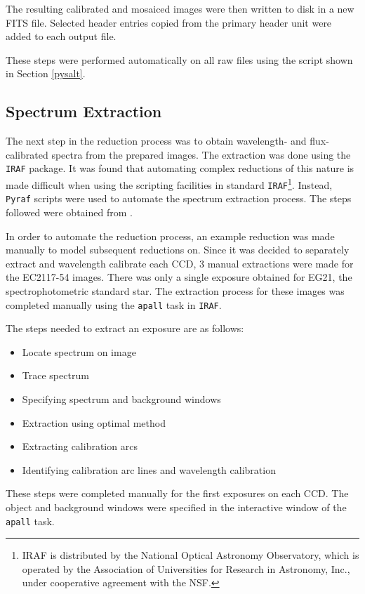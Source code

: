 The resulting calibrated and mosaiced images were then written to disk in a new FITS file. Selected header entries copied from the primary header unit were added to each output file.

These steps were performed automatically on all raw files using the script shown in Section \ref{pysalt}.


\subsection{Spectrum Extraction}
\label{specextract}

The next step in the reduction process was to obtain wavelength- and flux-calibrated spectra from the prepared images. The extraction was done using the \texttt{IRAF} package. It was found that automating complex reductions of this nature is made difficult when using the scripting facilities in standard \texttt{IRAF}\footnote{IRAF is distributed by the National Optical Astronomy Observatory, which is operated by the Association of Universities for Research in Astronomy, Inc., under cooperative agreement with the NSF.}. Instead, \texttt{Pyraf} scripts were used to automate the spectrum extraction process. The steps followed were obtained from \cite{slitspecIRAF}.

In order to automate the reduction process, an example reduction was made manually to model subsequent reductions on. Since it was decided to separately extract and wavelength calibrate each CCD, 3 manual extractions were made for the EC2117-54 images. There was only a single exposure obtained for EG21, the spectrophotometric standard star. The extraction process for these images was completed manually using the \texttt{apall} task in \texttt{IRAF}.

The steps needed to extract an exposure are as follows:

\begin{itemize}
 \item Locate spectrum on image
 \item Trace spectrum
 \item Specifying spectrum and background windows
 \item Extraction using optimal method
 \item Extracting calibration arcs
 \item Identifying calibration arc lines and wavelength calibration
\end{itemize}

These steps were completed manually for the first exposures on each CCD. The object and background windows were specified in the interactive window of the \texttt{apall} task.

